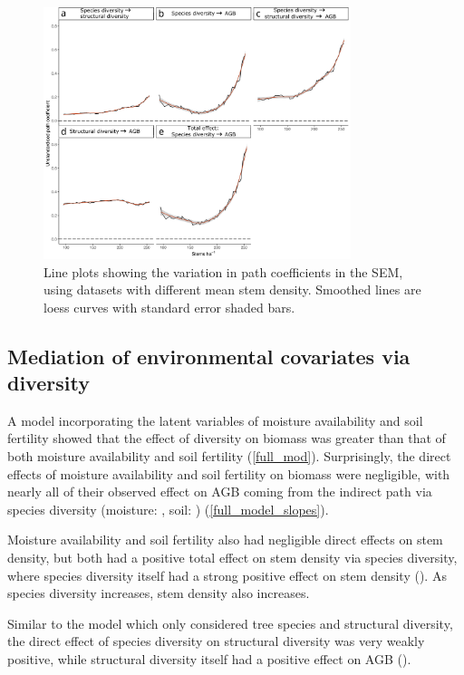\documentclass[11pt,a4paper]{article}
\begin{document}
\begin{figure}[H]
\centering
	\includegraphics[width=0.8\textwidth]{sem_struc_stems_ha}
	\caption{Line plots showing the variation in path coefficients in the SEM, using datasets with different mean stem density. Smoothed lines are loess curves with standard error shaded bars.}
	\label{sem_struc_stems_ha}
\end{figure}

\subsection{Mediation of environmental covariates via diversity}

A model incorporating the latent variables of moisture availability and soil fertility showed that the effect of diversity on biomass was greater than that of both moisture availability and soil fertility (\autoref{full_mod}). Surprisingly, the direct effects of moisture availability and soil fertility on biomass were negligible, with nearly all of their observed effect on AGB coming from the indirect path via species diversity (moisture: \rgmbd{}, soil: \rgsbd{}) (\autoref{full_model_slopes}). 

Moisture availability and soil fertility also had negligible direct effects on stem density, but both had a positive total effect on stem density via species diversity, where species diversity itself had a strong positive effect on stem density (\rgid{}). As species diversity increases, stem density also increases. 

Similar to the model which only considered tree species and structural diversity, the direct effect of species diversity on structural diversity was very weakly positive, while structural diversity itself had a positive effect on AGB (\rghb{}). 
\end{document}
